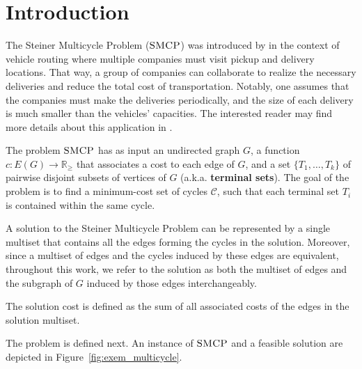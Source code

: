 \chapter{Introduction}
\label{chapter:introduction}

The Steiner Multicycle Problem (\(\textsc{SMCP}\)) was introduced by \cite{Pereira2018TheSM} in the context of vehicle routing where multiple companies must visit pickup and delivery locations. That way, a group of companies can collaborate to realize the necessary deliveries and reduce the total cost of transportation. 
Notably, one assumes that the companies must make the deliveries periodically, and the size of each delivery is much smaller than the vehicles' capacities.
The interested reader may find more details about this application in \cite{Pereira2018TheSM}.

The problem \(\textsc{SMCP}\) has as input an undirected graph \(G\), a function $c \colon E(G) \to \mathbb{R}_\ge$ that associates a cost to each edge of \(G\), and a set \(\{T_1, \dots, T_k\}\) of pairwise disjoint subsets of vertices of \(G\) (a.k.a. \textbf{terminal sets}). The goal of the problem is to find a minimum-cost set of cycles \(\mathcal{C}\), such that each terminal set \(T_i\) is contained within the same cycle.

A solution to the Steiner Multicycle Problem can be represented by a single multiset that contains all the edges forming the cycles in the solution. Moreover, since a multiset of edges and the cycles induced by these edges are equivalent, throughout this work, we refer to the solution as both the multiset of edges and the subgraph of \(G\) induced by those edges interchangeably.

The solution cost is defined as the sum of all associated costs of the edges in the solution multiset.

The problem is defined next. An instance of \(\textsc{SMCP}\) and a feasible solution are depicted in Figure~\ref{fig:exem_multicycle}.

\medskip
\noindent {}
\medskip

